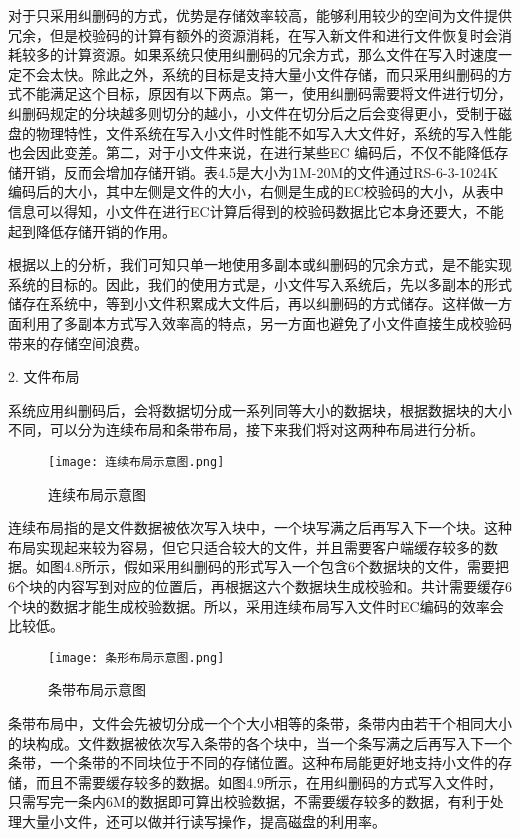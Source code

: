 对于只采用纠删码的方式，优势是存储效率较高，能够利用较少的空间为文件提供冗余，但是校验码的计算有额外的资源消耗，在写入新文件和进行文件恢复时会消耗较多的计算资源。如果系统只使用纠删码的冗余方式，那么文件在写入时速度一定不会太快。除此之外，系统的目标是支持大量小文件存储，而只采用纠删码的方式不能满足这个目标，原因有以下两点。第一，使用纠删码需要将文件进行切分，纠删码规定的分块越多则切分的越小，小文件在切分后之后会变得更小，受制于磁盘的物理特性，文件系统在写入小文件时性能不如写入大文件好，系统的写入性能也会因此变差。第二，对于小文件来说，在进行某些EC 编码后，不仅不能降低存储开销，反而会增加存储开销。表4.5是大小为1M-20M的文件通过RS-6-3-1024K编码后的大小，其中左侧是文件的大小，右侧是生成的EC校验码的大小，从表中信息可以得知，小文件在进行EC计算后得到的校验码数据比它本身还要大，不能起到降低存储开销的作用。

根据以上的分析，我们可知只单一地使用多副本或纠删码的冗余方式，是不能实现系统的目标的。因此，我们的使用方式是，小文件写入系统后，先以多副本的形式储存在系统中，等到小文件积累成大文件后，再以纠删码的方式储存。这样做一方面利用了多副本方式写入效率高的特点，另一方面也避免了小文件直接生成校验码带来的存储空间浪费。

2. 文件布局

系统应用纠删码后，会将数据切分成一系列同等大小的数据块，根据数据块的大小不同，可以分为连续布局和条带布局，接下来我们将对这两种布局进行分析。

\begin{figure}[h]
  \centering
  \texttt{[image: 连续布局示意图.png]}
  \caption{连续布局示意图}
\end{figure}

连续布局指的是文件数据被依次写入块中，一个块写满之后再写入下一个块。这种布局实现起来较为容易，但它只适合较大的文件，并且需要客户端缓存较多的数据。如图4.8所示，假如采用纠删码的形式写入一个包含6个数据块的文件，需要把6个块的内容写到对应的位置后，再根据这六个数据块生成校验和。共计需要缓存6个块的数据才能生成校验数据。所以，采用连续布局写入文件时EC编码的效率会比较低。

\begin{figure}[h]
  \centering
  \texttt{[image: 条形布局示意图.png]}
  \caption{条带布局示意图}
\end{figure}

条带布局中，文件会先被切分成一个个大小相等的条带，条带内由若干个相同大小的块构成。文件数据被依次写入条带的各个块中，当一个条写满之后再写入下一个条带，一个条带的不同块位于不同的存储位置。这种布局能更好地支持小文件的存储，而且不需要缓存较多的数据。如图4.9所示，在用纠删码的方式写入文件时，只需写完一条内6M的数据即可算出校验数据，不需要缓存较多的数据，有利于处理大量小文件，还可以做并行读写操作，提高磁盘的利用率。


